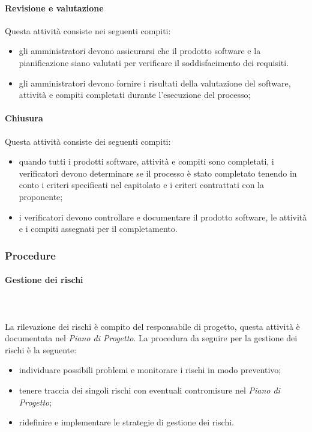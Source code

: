 		\paragraph{Revisione e valutazione}
		Questa attività consiste nei seguenti compiti:
		\begin{itemize}
			\item gli amministratori devono assicurarsi che il prodotto software e la pianificazione siano valutati per verificare il soddisfacimento dei requisiti.
			\item gli amministratori devono fornire i risultati della valutazione del software, attività e compiti completati durante l'esecuzione del processo;
		\end{itemize}
		\paragraph{Chiusura}
		Questa attività consiste dei seguenti compiti:
		\begin{itemize}
			\item quando tutti i prodotti software, attività e compiti sono completati, i verificatori devono determinare se il processo è stato completato tenendo in conto i criteri specificati nel capitolato e i criteri contrattati con la proponente;
			\item i verificatori devono controllare e documentare il prodotto software, le attività e i compiti assegnati per il completamento.
		\end{itemize}
		\subsubsection{Procedure}
		\paragraph{Gestione dei rischi} \mbox{}\\ \mbox{}\\
			La rilevazione dei rischi è compito del responsabile di progetto, questa attività è documentata nel \textit{Piano di Progetto}.
	        La procedura da seguire per la gestione dei rischi è la seguente:
			\begin{itemize}
				\item individuare possibili problemi e monitorare i rischi in modo preventivo;
				\item tenere traccia dei singoli rischi con eventuali contromisure nel \textit{Piano di Progetto};
				\item ridefinire e implementare le strategie di gestione dei rischi.
			\end{itemize}
			
